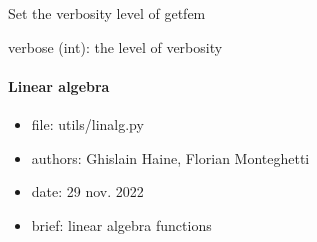 \documentclass[letterpaper,10pt,english]{sphinxmanual}
\begin{document}

\begin{fulllineitems}
\label{\detokenize{scrimp.utils:scrimp.utils.config.set_verbose_gf}}
\pysigstartsignatures
\pysiglinewithargsret
{}
{}
{}
\pysigstopsignatures
\sphinxAtStartPar
Set the verbosity level of getfem
\begin{description}
\sphinxAtStartPar
verbose (int): the level of verbosity

\end{description}

\end{fulllineitems}



\paragraph{Linear algebra}
\label{\detokenize{scrimp.utils:module-scrimp.utils.linalg}}\label{\detokenize{scrimp.utils:linear-algebra}}\begin{itemize}
\item {} 
\sphinxAtStartPar
file:             utils/linalg.py

\item {} 
\sphinxAtStartPar
authors:          Ghislain Haine, Florian Monteghetti

\item {} 
\sphinxAtStartPar
date:             29 nov. 2022

\item {} 
\sphinxAtStartPar
brief:            linear algebra functions

\end{itemize}

\begin{fulllineitems}
\label{\detokenize{scrimp.utils:scrimp.utils.linalg.EPS_get_spectrum}}
\pysigstartsignatures
\pysiglinewithargsret
{}
{\sphinxparamcomma {}}
{}
\pysigstopsignatures
\end{fulllineitems}
\end{document}
